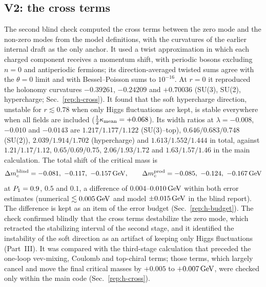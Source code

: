 \subsection{V2: the cross terms}\label{sec:v19-v2}

The second blind check computed the cross terms between the zero mode and the non-zero modes from the model definitions, with the curvatures of the earlier internal draft as the only anchor.
It used a twist approximation in which each charged component receives a momentum shift, with periodic bosons excluding $n=0$ and antiperiodic fermions; its direction-averaged twisted sums agree with the $\theta=0$ limit and with Bessel--Poisson sums to $10^{-16}$. %
At $r=0$ it reproduced the holonomy curvatures $-0.39261$, $-0.24209$ and $+0.70036$ (SU(3), SU(2), hypercharge; Sec.~\ref{rep:h-cross}). %
It found that the soft hypercharge direction, unstable for $r\lesssim0.78$ when only Higgs fluctuations are kept, is stable everywhere when all fields are included ($\frac12\kappa_{\rm mean}=+0.068$). %
Its width ratios at $\lambda=-0.008$, $-0.010$ and $-0.0143$ are $1.217/\allowbreak 1.177/\allowbreak 1.122$ (SU(3)--top), $0.646/\allowbreak 0.683/\allowbreak 0.748$ (SU(2)), $2.039/\allowbreak 1.914/\allowbreak 1.702$ (hypercharge) and $1.613/\allowbreak 1.552/\allowbreak 1.444$ in total, against $1.21/\allowbreak 1.17/\allowbreak 1.12$, $0.65/\allowbreak 0.69/\allowbreak 0.75$, $2.06/\allowbreak 1.93/\allowbreak 1.72$ and $1.63/\allowbreak 1.57/\allowbreak 1.46$ in the main calculation. %
The total shift of the critical mass is
\begin{equation}
\Delta m_c^{\rm blind}=-0.081,\ -0.117,\ -0.157\GeV,\qquad \Delta m_c^{\rm prod}=-0.085,\ -0.124,\ -0.167\GeV
\label{eq:v19-v2}
\end{equation}
at $P_1=0.9$, $0.5$ and $0.1$, a difference of $0.004$--$0.010\,\mathrm{GeV}$ within both error estimates (numerical $\lesssim0.005\,\mathrm{GeV}$ and model $\pm0.015\,\mathrm{GeV}$ in the blind report). %
The difference is kept as an item of the error budget (Sec.~\ref{rep:h-budget}).
The check confirmed blindly that the cross terms destabilize the zero mode, which retracted the stabilizing interval of the second stage, and it identified the instability of the soft direction as an artifact of keeping only Higgs fluctuations (Part~III).
It was compared with the third-stage calculation that preceded the one-loop vev-mixing, Coulomb and top-chiral terms; those terms, which largely cancel and move the final critical masses by $+0.005$ to $+0.007\,\mathrm{GeV}$, were checked only within the main code (Sec.~\ref{rep:h-cross}). %

